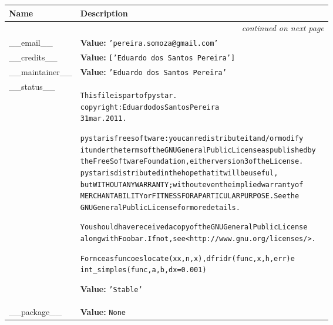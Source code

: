     \vspace{-1cm}
\hspace{\varindent}\begin{longtable}{|p{\varnamewidth}|p{\vardescrwidth}|l}
\cline{1-2}
\cline{1-2} \centering \textbf{Name} & \centering \textbf{Description}& \\
\cline{1-2}
\endhead\cline{1-2}\multicolumn{3}{r}{\small\textit{continued on next page}}\\\endfoot\cline{1-2}
\endlastfoot\raggedright \_\-\_\-e\-m\-a\-i\-l\-\_\-\_\- & \raggedright \textbf{Value:} 
{\tt \texttt{'}\texttt{pereira.somoza@gmail.com}\texttt{'}}&\\
\cline{1-2}
\raggedright \_\-\_\-c\-r\-e\-d\-i\-t\-s\-\_\-\_\- & \raggedright \textbf{Value:} 
{\tt \texttt{[}\texttt{'}\texttt{Eduardo dos Santos Pereira}\texttt{'}\texttt{]}}&\\
\cline{1-2}
\raggedright \_\-\_\-m\-a\-i\-n\-t\-a\-i\-n\-e\-r\-\_\-\_\- & \raggedright \textbf{Value:} 
{\tt \texttt{'}\texttt{Eduardo dos Santos Pereira}\texttt{'}}&\\
\cline{1-2}
\raggedright \_\-\_\-s\-t\-a\-t\-u\-s\-\_\-\_\- & \raggedright \begin{alltt}


    This file is part of pystar.
    copyright : Eduardo dos Santos Pereira
    31 mar. 2011.

    pystar is free software: you can redistribute it and/or modify
    it under the terms of the GNU General Public License as published by
    the Free Software Foundation, either version 3 of the License.
    pystar is distributed in the hope that it will be useful,
    but WITHOUT ANY WARRANTY; without even the implied warranty of
    MERCHANTABILITY or FITNESS FOR A PARTICULAR PURPOSE.  See the
    GNU General Public License for more details.

    You should have received a copy of the GNU General Public License
    along with Foobar.  If not, see {\textless}http://www.gnu.org/licenses/{\textgreater}.

Fornce as funcoes locate(xx,n,x), dfridr(func,x,h,err) e
int\_simples(func,a,b,dx =0.001)
\end{alltt}

\textbf{Value:} 
{\tt \texttt{'}\texttt{Stable}\texttt{'}}&\\
\cline{1-2}
\raggedright \_\-\_\-p\-a\-c\-k\-a\-g\-e\-\_\-\_\- & \raggedright \textbf{Value:} 
{\tt None}&\\
\cline{1-2}
\end{longtable}

